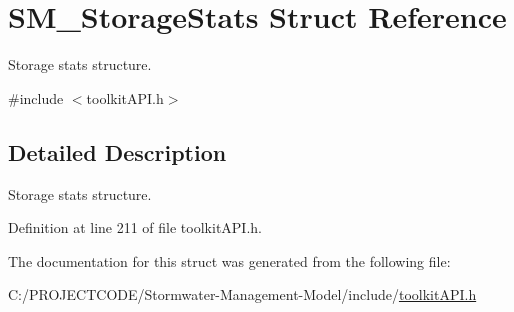 \hypertarget{struct_s_m___storage_stats}{}\section{S\+M\+\_\+\+Storage\+Stats Struct Reference}
\label{struct_s_m___storage_stats}


Storage stats structure.  




{\ttfamily \#include $<$toolkit\+A\+P\+I.\+h$>$}



\subsection{Detailed Description}
Storage stats structure. 

Definition at line 211 of file toolkit\+A\+P\+I.\+h.



The documentation for this struct was generated from the following file\+:\begin{DoxyCompactItemize}
\item 
C\+:/\+P\+R\+O\+J\+E\+C\+T\+C\+O\+D\+E/\+Stormwater-\/\+Management-\/\+Model/include/\hyperlink{toolkit_a_p_i_8h}{toolkit\+A\+P\+I.\+h}\end{DoxyCompactItemize}
